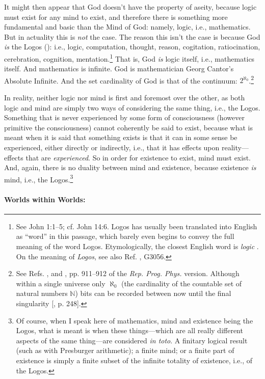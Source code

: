 \documentclass[letterpaper,12pt]{article}
\begin{document}
It might then appear that God doesn't have the property of aseity, because logic must exist for any mind to exist, and therefore there is something more fundamental and basic than the Mind of God: namely, logic, i.e., mathematics. But in actuality this is \emph{not} the case. The reason this isn't the case is because God \emph{is} the Logos (): i.e., logic, computation, thought, reason, cogitation, ratiocination, cerebration, cognition, mentation.\footnote{See John 1:1--5; cf. John 14:6. Logos has usually been translated into English as ``word'' in this passage, which barely even begins to convey the full meaning of the word Logos. Etymologically, the closest English word is \emph{logic} \cite{SimpsonWeiner1989}. On the meaning of \emph{Logos}, see also Ref. , G3056.} That is, God \emph{is} logic itself, i.e., mathematics itself. And mathematics is infinite. God is mathematician Georg Cantor's Absolute Infinite. And the set cardinality of God is that of the continuum: \( 2^{\aleph_0} \).\footnote{See Refs. , and , pp. 911--912 of the \emph{Rep. Prog. Phys.} version. Although within a single universe only \( \aleph_0 \) (the cardinality of the countable set of natural numbers \( \mathbb{N} \)) bits can be recorded between now until the final singularity [, p. 248].}

In reality, neither logic nor mind is first and foremost over the other, as both logic and mind are simply two ways of considering the same thing, i.e., the Logos. Something that is never experienced by some form of consciousness (however primitive the consciousness) cannot coherently be said to exist, because what is meant when it is said that something exists is that it can in some sense be experienced, either directly or indirectly, i.e., that it has effects upon reality---effects that are \emph{experienced}. So in order for existence to exist, mind must exist. And, again, there is no duality between mind and existence, because existence \emph{is} mind, i.e., the Logos.\footnote{Of course, when I speak here of mathematics, mind and existence being the Logos, what is meant is when these things---which are all really different aspects of the same thing---are considered \emph{in toto}. A finitary logical result (such as with Presburger arithmetic); a finite mind; or a finite part of existence is simply a finite subset of the infinite totality of existence, i.e., of the Logos.}

\paragraph{Worlds within Worlds:}
\label{parag:WorldsWithinWorlds}
\end{document}
